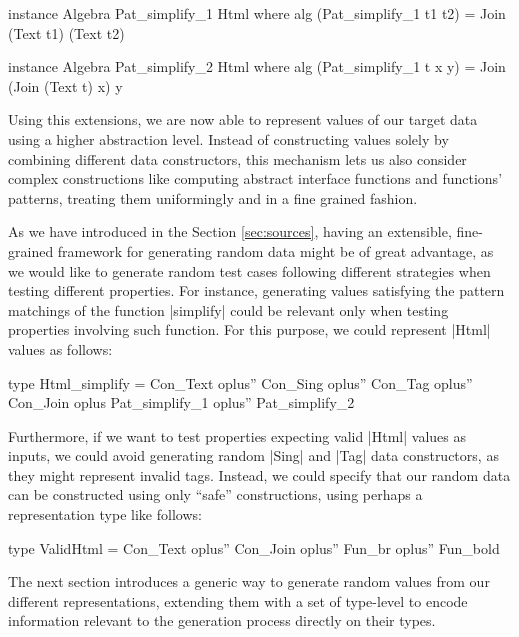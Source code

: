 \begin{code}
instance Algebra Pat_simplify_1 Html where
  alg (Pat_simplify_1 t1 t2) = Join (Text t1) (Text t2)

instance Algebra Pat_simplify_2 Html where
  alg (Pat_simplify_1 t x y) = Join (Join (Text t) x) y
\end{code}

%
%
Using this extensions, we are now able to represent values of our target data
using a higher abstraction level.
%
Instead of constructing values solely by combining different data constructors,
this mechanism lets us also consider complex constructions like computing
abstract interface functions and functions' patterns, treating them uniformingly
and in a fine grained fashion.


As we have introduced in the Section \ref{sec:sources}, having an extensible,
fine-grained framework for generating random data might be of great advantage,
as we would like to generate random test cases following different strategies
when testing different properties.
%
For instance, generating values satisfying the pattern matchings of the function
|simplify| could be relevant only when testing properties involving such
function.
%
For this purpose, we could represent |Html| values as follows:
%
\begin{code}
type Html_simplify  =      Con_Text oplus'' Con_Sing oplus'' Con_Tag oplus'' Con_Join
                    oplus  Pat_simplify_1 oplus'' Pat_simplify_2
\end{code}


%
Furthermore, if we want to test properties expecting valid |Html| values as
inputs, we could avoid generating random |Sing| and |Tag| data constructors, as
they might represent invalid tags.
%
Instead, we could specify that our random data can be constructed using only
``safe'' constructions, using perhaps a representation type like follows:

\begin{code}
type ValidHtml = Con_Text oplus'' Con_Join oplus'' Fun_br oplus'' Fun_bold
\end{code}


The next section introduces a generic way to generate random values from our
different representations, extending them with a set of type-level to encode
information relevant to the generation process directly on their types.